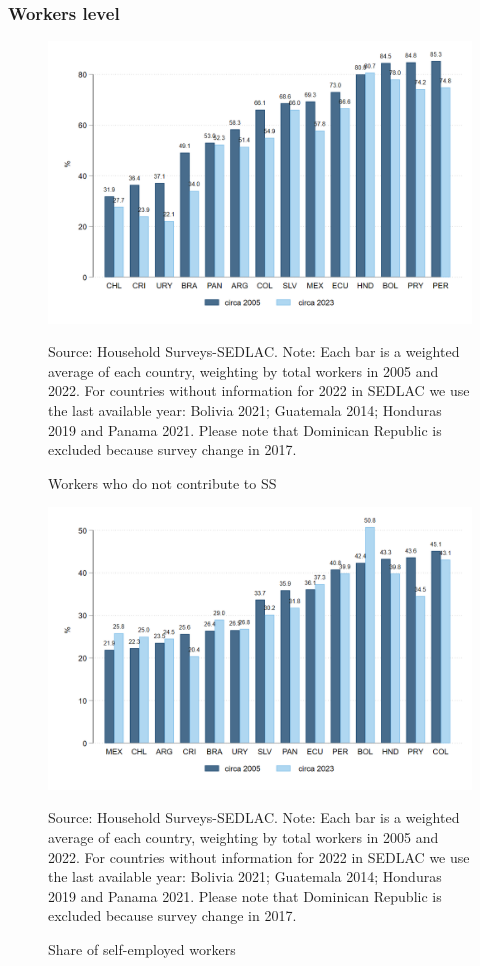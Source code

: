 \documentclass[english]{article}
\begin{document}
\subsubsection{Workers level} 
\begin{figure}[H]
    \justifying
     \caption{Workers who do not contribute to SS}     
     \centerline{\includegraphics[scale=.3]{latex/figures/Snapshot/snapshot_informal_ss.png}
    \label{fig:SalariedSS}}
    \footnotesize{Source: Household Surveys-SEDLAC.}
    \footnotesize{Note: Each bar is a weighted average of each country, weighting by total workers in 2005 and 2022. For countries without information for 2022 in SEDLAC we use the last available year: Bolivia 2021; Guatemala 2014; Honduras 2019 and Panama 2021. Please note that Dominican Republic is excluded because survey change in 2017.}
\end{figure}

\begin{figure}[H]
    \justifying
     \caption{Share of self-employed workers}     
     \centerline{\includegraphics[scale=.3]{latex/figures/Snapshot/snapshot_self_employed.png}
    \label{fig:SalariedSS}}
    \footnotesize{Source: Household Surveys-SEDLAC.}
    \footnotesize{Note: Each bar is a weighted average of each country, weighting by total workers in 2005 and 2022. For countries without information for 2022 in SEDLAC we use the last available year: Bolivia 2021; Guatemala 2014; Honduras 2019 and Panama 2021. Please note that Dominican Republic is excluded because survey change in 2017.}
\end{figure}
\end{document}
